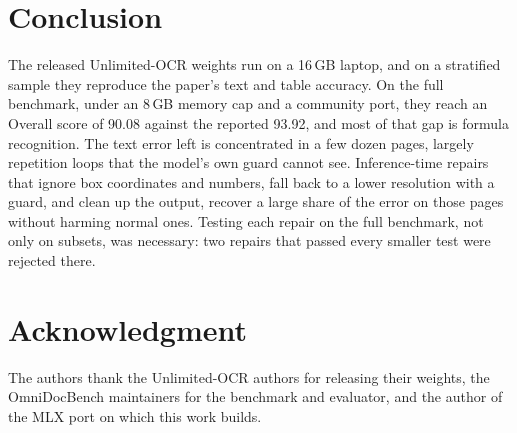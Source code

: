 \documentclass[journal]{IEEEtran}
\begin{document}
\section{Conclusion}

The released Unlimited-OCR weights run on a 16\,GB laptop, and on a stratified
sample they reproduce the paper's text and table accuracy. On the full
benchmark, under an 8\,GB memory cap and a community port, they reach an Overall
score of 90.08 against the reported 93.92, and most of that gap is formula
recognition. The text error left is concentrated in a few dozen pages, largely
repetition loops that the model's own guard cannot see. Inference-time repairs
that ignore box coordinates and numbers, fall back to a lower resolution with a
guard, and clean up the output, recover a large share of the error on those
pages without harming normal ones. Testing each repair on the full benchmark,
not only on subsets, was necessary: two repairs that passed every smaller test
were rejected there.

\section*{Acknowledgment}

The authors thank the Unlimited-OCR authors for releasing their weights, the
OmniDocBench maintainers for the benchmark and evaluator, and the author of the
MLX port on which this work builds.
\end{document}
